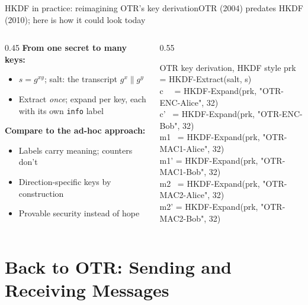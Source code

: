 \ifdefined\PRESENTATION\else\PassOptionsToClass{handout}{beamer}\fi\documentclass[aspectratio=169, lualatex]{beamer}
\begin{document}
\begin{frame}{HKDF in practice: reimagining OTR's key derivation}{OTR (2004) predates HKDF (2010); here is how it could look today}
	\begin{columns}[c]
		\begin{column}{0.45\textwidth}
			\textbf{From one secret to many keys:}
			\begin{itemize}
				\item $s = g^{xy}$; salt: the transcript $g^x \| g^y$
				\item Extract \textit{once}; expand per key, each with its own \texttt{info} label
			\end{itemize}
			\textbf{Compare to the ad-hoc approach:}
			\begin{itemize}
				\item Labels carry meaning; counters don't
				\item Direction-specific keys by construction
				\item Provable security instead of hope
			\end{itemize}
		\end{column}
		\begin{column}{0.55\textwidth}
			\begin{exampleblock}{OTR key derivation, HKDF style}
				\ttfamily\scriptsize
				prk = HKDF-Extract(salt, s)\\
				c \ \ = HKDF-Expand(prk, "OTR-ENC-Alice", 32)\\
				c' \ = HKDF-Expand(prk, "OTR-ENC-Bob", 32)\\
				m1 \ = HKDF-Expand(prk, "OTR-MAC1-Alice", 32)\\
				m1' = HKDF-Expand(prk, "OTR-MAC1-Bob", 32)\\
				m2 \ = HKDF-Expand(prk, "OTR-MAC2-Alice", 32)\\
				m2' = HKDF-Expand(prk, "OTR-MAC2-Bob", 32)
			\end{exampleblock}
		\end{column}
	\end{columns}
\end{frame}

\section{Back to OTR: Sending and Receiving Messages}
\end{document}
